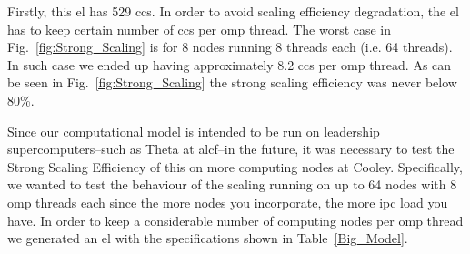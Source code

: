 \documentclass[11pt,a4paper]{article}
\begin{document}
Firstly, this \gls{el} has 529 \glspl{cc}. In order to avoid scaling efficiency degradation, the \gls{el} has to keep certain number of \glspl{cc} per \gls{omp} thread. The worst case in Fig.~\ref{fig:Strong_Scaling} is for 8 nodes running 8 threads each (i.e. 64 threads). In such case we ended up having approximately 8.2 \glspl{cc} per \gls{omp} thread. As can be seen in Fig.~\ref{fig:Strong_Scaling} the strong scaling efficiency was never below 80\%. 

Since our computational model is intended to be run on leadership supercomputers--such as Theta at \gls{alcf}--in the future, it was necessary to test the Strong Scaling Efficiency of this on more computing nodes at Cooley. Specifically, we wanted to test the behaviour of the scaling running on up to 64 nodes with 8 \gls{omp} threads each since the more nodes you incorporate, the more \gls{ipc} load you have. In order to keep a considerable number of computing nodes per \gls{omp} thread we generated an \gls{el} with the specifications shown in Table~\ref{Big_Model}. 
\end{document}
